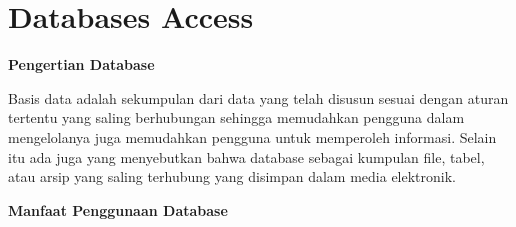 \documentclass{wileySix}
\begin{document}
\chapter{Databases Access}
 \par
\noindent 
\textbf{Pengertian Database} \par
Basis data adalah sekumpulan dari data yang telah disusun sesuai dengan aturan tertentu yang saling berhubungan sehingga memudahkan pengguna dalam mengelolanya juga memudahkan pengguna untuk memperoleh informasi. Selain itu ada juga yang menyebutkan bahwa database sebagai kumpulan file, tabel, atau arsip yang saling terhubung yang disimpan dalam media elektronik.  \par
\vspace{12pt}
\noindent 
\textbf{Manfaat Penggunaan Database} \par
\noindent 
\end{document}
